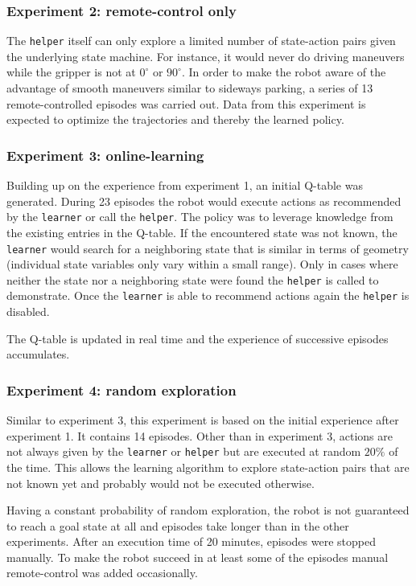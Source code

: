 \subsubsection{Experiment 2: remote-control only}
The \texttt{helper} itself can only explore a limited number of state-action pairs given the underlying state machine. For instance, it would never do driving maneuvers while the gripper is not at $0^\circ$ or $90^\circ$. In order to make the robot aware of the advantage of smooth maneuvers similar to sideways parking, a series of 13 remote-controlled episodes was carried out. Data from this experiment is expected to optimize the trajectories and thereby the learned policy.

\subsubsection{Experiment 3: online-learning}
Building up on the experience from experiment 1, an initial Q-table was generated. During 23 episodes the robot would execute actions as recommended by the \texttt{learner} or call the \texttt{helper}. The policy was to leverage knowledge from the existing entries in the Q-table. If the encountered state was not known, the \texttt{learner} would search for a neighboring state that is similar in terms of geometry (individual state variables only vary within a small range). Only in cases where neither the state nor a neighboring state were found the \texttt{helper} is called to demonstrate. Once the \texttt{learner} is able to recommend actions again the \texttt{helper} is disabled.

The Q-table is updated in real time and the experience of successive episodes accumulates.

\subsubsection{Experiment 4: random exploration}
Similar to experiment 3, this experiment is based on the initial experience after experiment 1. It contains 14 episodes. Other than in experiment 3, actions are not always given by the \texttt{learner} or \texttt{helper} but are executed at random $20\%$ of the time. This allows the learning algorithm to explore state-action pairs that are not known yet and probably would not be executed otherwise. 

Having a constant probability of random exploration, the robot is not guaranteed to reach a goal state at all and episodes take longer than in the other experiments. After an execution time of 20 minutes, episodes were stopped manually. To make the robot succeed in at least some of the episodes manual remote-control was added occasionally.

